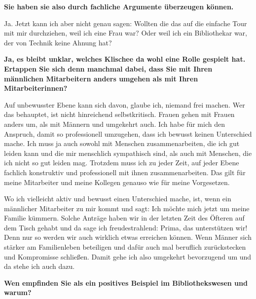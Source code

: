 \documentclass[a4paper,
fontsize=11pt,
oneside,
numbers=noperiodatend,
parskip=half-,
bibliography=totoc,
final
]{scrartcl}
\begin{document}
\textbf{Sie haben sie also durch fachliche Argumente überzeugen können.}

Ja. Jetzt kann ich aber nicht genau sagen: Wollten die das auf die
einfache Tour mit mir durchziehen, weil ich eine Frau war? Oder weil ich
ein Bibliothekar war, der von Technik keine Ahnung hat?

\textbf{Ja, es bleibt unklar, welches Klischee da wohl eine Rolle
gespielt hat. Ertappen Sie sich denn manchmal dabei, dass Sie mit Ihren
männlichen Mitarbeitern anders umgehen als mit Ihren Mitarbeiterinnen?}

Auf unbewusster Ebene kann sich davon, glaube ich, niemand frei machen.
Wer das behauptet, ist nicht hinreichend selbstkritisch. Frauen gehen
mit Frauen anders um, als mit Männern und umgekehrt auch. Ich habe für
mich den Anspruch, damit so professionell umzugehen, dass ich bewusst
keinen Unterschied mache. Ich muss ja auch sowohl mit Menschen
zusammenarbeiten, die ich gut leiden kann und die mir menschlich
sympathisch sind, als auch mit Menschen, die ich nicht so gut leiden
mag. Trotzdem muss ich zu jeder Zeit, auf jeder Ebene fachlich
konstruktiv und professionell mit ihnen zusammenarbeiten. Das gilt für
meine Mitarbeiter und meine Kollegen genauso wie für meine Vorgesetzen.

Wo ich vielleicht aktiv und bewusst einen Unterschied mache, ist, wenn
ein männlicher Mitarbeiter zu mir kommt und sagt: Ich möchte mich jetzt
um meine Familie kümmern. Solche Anträge haben wir in der letzten Zeit
des Öfteren auf dem Tisch gehabt und da sage ich freudestrahlend: Prima,
das unterstützen wir! Denn nur so werden wir auch wirklich etwas
erreichen können. Wenn Männer sich stärker am Familienleben beteiligen
und dafür auch mal beruflich zurückstecken und Kompromisse schließen.
Damit gehe ich also umgekehrt bevorzugend um und da stehe ich auch dazu.

\textbf{Wen empfinden Sie als ein positives Beispiel im Bibliothekswesen
und warum?}
\end{document}

